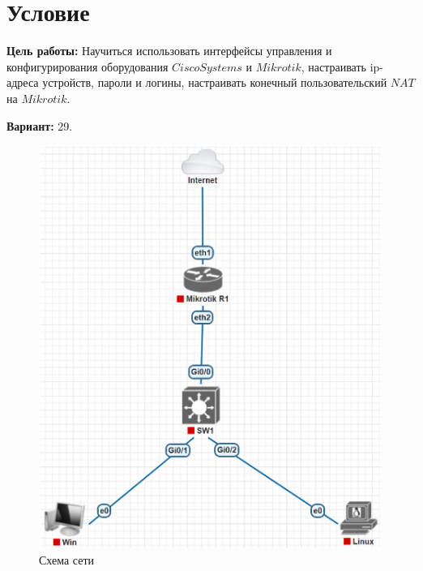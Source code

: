 \section{Условие}
{\bfseries Цель работы:} Научиться использовать интерфейсы управления и конфигурирования оборудования $Cisco Systems$ и $Mikrotik$, настраивать ip-адреса устройств, пароли и логины, настраивать конечный пользовательский $NAT$ на $Mikrotik$.

{\bfseries Вариант:} 29.

\begin{figure}[h!]
    \centering
    \includegraphics[]{./img/sheme.png}
    \caption{Схема сети}
\end{figure}

